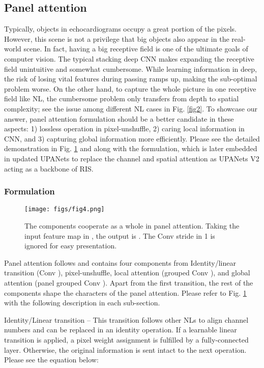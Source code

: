 \documentclass{article}
\begin{document}
\subsection{Panel attention}
\label{sec4.1}
Typically, objects in echocardiograms occupy a great portion of the pixels. However, this scene is not a privilege that big objects also appear in the real-world scene. In fact, having a big receptive field is one of the ultimate goals of computer vision. The typical stacking deep CNN makes expanding the receptive field unintuitive and somewhat cumbersome. While learning information in deep, the risk of losing vital features during passing ramps up, making the sub-optimal problem worse. On the other hand, to capture the whole picture in one receptive field like NL, the cumbersome problem only transfers from depth to spatial complexity; see the issue among different NL cases in Fig. \ref{fig2}. To showcase our answer, panel attention formulation should be a better candidate in these aspects: 1) lossless operation in pixel-unshuffle, 2) caring local information in CNN, and 3) capturing global information more efficiently. Please see the detailed demonstration in Fig. \ref{fig4} and along with the formulation, which is later embedded in updated UPANets to replace the channel and spatial attention as UPANets V2 acting as a backbone of RIS. 

\subsubsection{Formulation}
\label{sec4.1.1}
\begin{figure}[!t]
    \centering
    \texttt{[image: figs/fig4.png]}
    \caption{The components cooperate as a whole in panel attention. Taking the input feature map in , the output is . The Conv stride in 1 is ignored for easy presentation.}
    \label{fig4}
\end{figure}

Panel attention follows and contains four components from Identity/linear transition (Conv ), pixel-unshuffle, local attention (grouped Conv ), and global attention (panel grouped Conv ). Apart from the first transition, the rest of the components shape the characters of the panel attention. Please refer to Fig. \ref{fig4} with the following description in each sub-section.

Identity/Linear transition – This transition follows other NLs to align channel numbers and can be replaced in an identity operation. If a learnable linear transition is applied, a pixel weight assignment is fulfilled by a fully-connected layer. Otherwise, the original information is sent intact to the next operation. Please see the equation below:
\useshortskip
\end{document}
